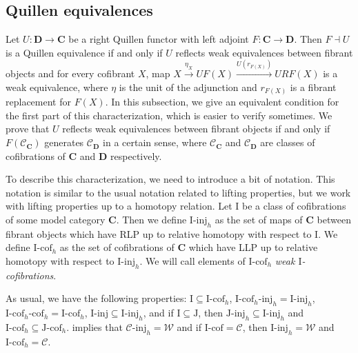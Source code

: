 \documentclass{tac}
\theoremstyle{definition}
\newcommand{\we}{\mathcal{W}}
\newcommand{\cof}{\mathcal{C}}
\newcommand{\cat}[1]{\mathbf{#1}}
\newcommand{\C}{\cat{C}}
\newcommand{\D}{\cat{D}}
\newcommand{\I}{\mathrm{I}}
\newcommand{\J}{\mathrm{J}}
\newcommand{\class}[2]{#1\text{-}\mathrm{#2}}
\newcommand{\Iinj}[1][\I]{\class{#1}{inj}}
\newcommand{\Icof}[1][\I]{\class{#1}{cof}}
\newcommand{\Jinj}[1][]{\Iinj[\J#1]}
\newcommand{\Jcof}[1][]{\Icof[\J#1]}
\begin{document}
\subsection{Quillen equivalences}

Let $U : \D \to \C$ be a right Quillen functor with left adjoint $F : \C \to \D$.
Then $F \dashv U$ is a Quillen equivalence if and only if $U$ reflects weak equivalences between fibrant objects and
for every cofibrant $X$, map $X \xrightarrow{\eta_X} UF(X) \xrightarrow{U(r_{F(X)})} URF(X)$ is a weak equivalence,
where $\eta$ is the unit of the adjunction and $r_{F(X)}$ is a fibrant replacement for $F(X)$.
In this subsection, we give an equivalent condition for the first part of this characterization, which is easier to verify sometimes.
We prove that $U$ reflects weak equivalences between fibrant objects if and only if $F(\cof_\C)$ generates $\cof_\D$ in a certain sense,
where $\cof_\C$ and $\cof_\D$ are classes of cofibrations of $\C$ and $\D$ respectively.

To describe this characterization, we need to introduce a bit of notation.
This notation is similar to the usual notation related to lifting properties, but we work with lifting properties up to a homotopy relation.
Let $\I$ be a class of cofibrations of some model category $\C$.
Then we define $\Iinj_h$ as the set of maps of $\C$ between fibrant objects which have RLP up to relative homotopy with respect to $\I$.
We define $\Icof_h$ as the set of cofibrations of $\C$ which have LLP up to relative homotopy with respect to $\Iinj_h$.
We will call elements of $\Icof_h$ \emph{weak $\I$-cofibrations}.

As usual, we have the following properties: $\I \subseteq \Icof_h$, $\Iinj[\Icof_h]_h = \Iinj_h$, $\Icof[\Icof_h]_h = \Icof_h$, $\Iinj \subseteq \Iinj_h$,
and if $\I \subseteq \J$, then $\Jinj_h \subseteq \Iinj_h$ and $\Icof_h \subseteq \Jcof_h$.
 implies that $\Iinj[\cof]_h = \we$ and if $\Icof = \cof$, then $\Iinj_h = \we$ and $\Icof_h = \cof$.
\end{document}
